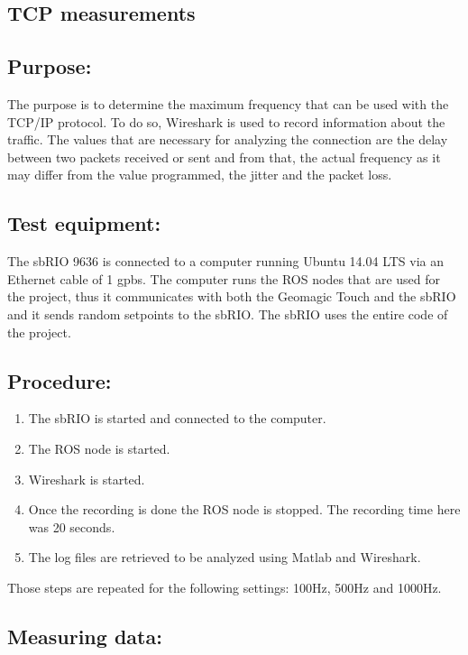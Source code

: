 \subsection{TCP measurements}\label{sec_tcp_mes}

\subsection*{Purpose:}

The purpose is to determine the maximum frequency that can be used with the TCP/IP protocol.  To do so, Wireshark is used to record information about the traffic. The values that are necessary for analyzing the connection are the delay between two packets received or sent and from that, the actual frequency as it may differ from the value programmed, the jitter and the packet loss. 
\subsection*{Test equipment:}

The sbRIO 9636 is connected to a computer running Ubuntu 14.04 LTS via an Ethernet cable of 1 gpbs. The computer runs the ROS nodes that are used for the project, thus it communicates with both the Geomagic Touch and the sbRIO and it sends random setpoints to the sbRIO. The sbRIO uses the entire code of the project.

\subsection*{Procedure:}

\begin{enumerate}
	\item The sbRIO is started and connected to the computer.
	\item The ROS node is started.
	\item Wireshark is started.%
	\item Once the recording is done the ROS node is stopped. The recording time here was 20 seconds.
	\item The log files are retrieved to be analyzed using Matlab and Wireshark.
\end{enumerate}
Those steps are repeated for the following settings: 100Hz, 500Hz and 1000Hz.


\subsection*{Measuring data:}

